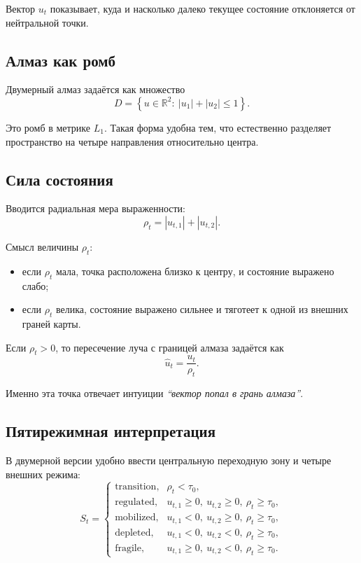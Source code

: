 \documentclass[12pt,a4paper]{article}
\begin{document}
Вектор $u_t$ показывает, куда и насколько далеко текущее состояние отклоняется от нейтральной точки.

\subsection{Алмаз как ромб}
Двумерный алмаз задаётся как множество
\begin{equation}
D=\left\{u\in\mathbb{R}^2:\ |u_1|+|u_2|\le 1\right\}.
\end{equation}

Это ромб в метрике $L_1$. Такая форма удобна тем, что естественно разделяет пространство на четыре направления относительно центра.

\subsection{Сила состояния}
Вводится радиальная мера выраженности:
\begin{equation}
\rho_t = |u_{t,1}|+|u_{t,2}|.
\end{equation}

Смысл величины $\rho_t$:
\begin{itemize}[leftmargin=1.25cm]
    \item если $\rho_t$ мала, точка расположена близко к центру, и состояние выражено слабо;
    \item если $\rho_t$ велика, состояние выражено сильнее и тяготеет к одной из внешних граней карты.
\end{itemize}

Если $\rho_t > 0$, то пересечение луча с границей алмаза задаётся как
\begin{equation}
\hat{u}_t=\frac{u_t}{\rho_t}.
\end{equation}

Именно эта точка отвечает интуиции \textit{``вектор попал в грань алмаза''}.

\subsection{Пятирежимная интерпретация}
В двумерной версии удобно ввести центральную переходную зону и четыре внешних режима:
\begin{equation}
S_t=
\begin{cases}
\text{transition}, & \rho_t < \tau_0,\\
\text{regulated}, & u_{t,1}\ge 0,\ u_{t,2}\ge 0,\ \rho_t\ge \tau_0,\\
\text{mobilized}, & u_{t,1}<0,\ u_{t,2}\ge 0,\ \rho_t\ge \tau_0,\\
\text{depleted}, & u_{t,1}<0,\ u_{t,2}<0,\ \rho_t\ge \tau_0,\\
\text{fragile}, & u_{t,1}\ge 0,\ u_{t,2}<0,\ \rho_t\ge \tau_0.
\end{cases}
\end{equation}
\end{document}
